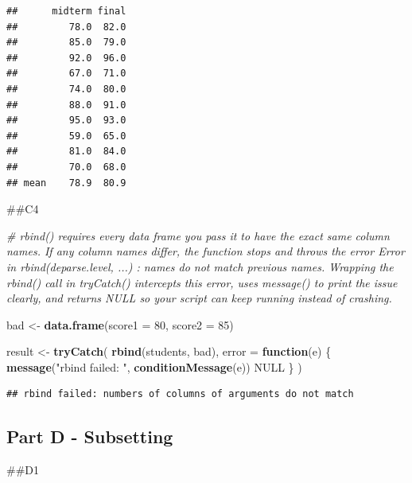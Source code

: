 \documentclass[
]{article}
\newenvironment{Shaded}{\begin{snugshade}}{\end{snugshade}}
\newcommand{\AttributeTok}[1]{\textcolor[rgb]{0.13,0.29,0.53}{#1}}
\newcommand{\CommentTok}[1]{\textcolor[rgb]{0.56,0.35,0.01}{\textit{#1}}}
\newcommand{\ConstantTok}[1]{\textcolor[rgb]{0.56,0.35,0.01}{#1}}
\newcommand{\ControlFlowTok}[1]{\textcolor[rgb]{0.13,0.29,0.53}{\textbf{#1}}}
\newcommand{\DecValTok}[1]{\textcolor[rgb]{0.00,0.00,0.81}{#1}}
\newcommand{\FunctionTok}[1]{\textcolor[rgb]{0.13,0.29,0.53}{\textbf{#1}}}
\newcommand{\NormalTok}[1]{#1}
\newcommand{\OtherTok}[1]{\textcolor[rgb]{0.56,0.35,0.01}{#1}}
\newcommand{\SpecialCharTok}[1]{\textcolor[rgb]{0.81,0.36,0.00}{\textbf{#1}}}
\newcommand{\StringTok}[1]{\textcolor[rgb]{0.31,0.60,0.02}{#1}}
\begin{document}
\begin{verbatim}
##      midterm final
##         78.0  82.0
##         85.0  79.0
##         92.0  96.0
##         67.0  71.0
##         74.0  80.0
##         88.0  91.0
##         95.0  93.0
##         59.0  65.0
##         81.0  84.0
##         70.0  68.0
## mean    78.9  80.9
\end{verbatim}

\#\#C4

\begin{Shaded}
\begin{Highlighting}[]
\CommentTok{\# rbind() requires every data frame you pass it to have the exact same column names. If any column names differ, the function stops and throws the error Error in rbind(deparse.level, ...) : names do not match previous names. Wrapping the rbind() call in tryCatch() intercepts this error, uses message() to print the issue clearly, and returns NULL so your script can keep running instead of crashing.}

\NormalTok{bad }\OtherTok{\textless{}{-}} \FunctionTok{data.frame}\NormalTok{(}\AttributeTok{score1 =} \DecValTok{80}\NormalTok{, }\AttributeTok{score2 =} \DecValTok{85}\NormalTok{)}

\NormalTok{result }\OtherTok{\textless{}{-}} \FunctionTok{tryCatch}\NormalTok{(}
  \FunctionTok{rbind}\NormalTok{(students, bad), }
  \AttributeTok{error =} \ControlFlowTok{function}\NormalTok{(e) \{ }
    \FunctionTok{message}\NormalTok{(}\StringTok{"rbind failed: "}\NormalTok{, }\FunctionTok{conditionMessage}\NormalTok{(e))}
    \ConstantTok{NULL} 
\NormalTok{  \}}
\NormalTok{)}
\end{Highlighting}
\end{Shaded}

\begin{verbatim}
## rbind failed: numbers of columns of arguments do not match
\end{verbatim}

\subsection{Part D - Subsetting}\label{part-d---subsetting}

\#\#D1

\begin{Shaded}
\end{Shaded}
\end{document}
